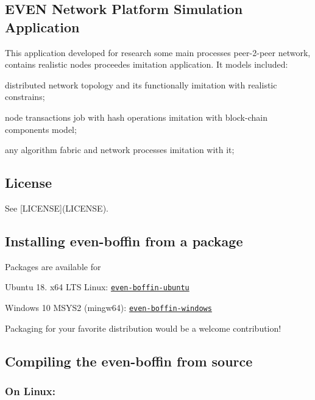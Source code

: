 \subsection*{E\+V\+EN Network Platform Simulation Application}

This application developed for research some main processes peer-\/2-\/peer network, contains realistic nodes proceedes imitation application. It models included\+:
\begin{DoxyItemize}
\item distributed network topology and its functionally imitation with realistic constrains;
\item node transactions job with hash operations imitation with block-\/chain components model;
\item any algorithm fabric and network processes imitation with it;
\end{DoxyItemize}

\subsection*{License}

See \mbox{[}L\+I\+C\+E\+N\+SE\mbox{]}(L\+I\+C\+E\+N\+SE).

\subsection*{Installing even-\/boffin from a package}

Packages are available for


\begin{DoxyItemize}
\item Ubuntu 18. x64 L\+TS Linux\+: \href{https://evenfound.org/packages/event-network-ubuntu/}{\tt even-\/boffin-\/ubuntu}
\item Windows 10 M\+S\+Y\+S2 (mingw64)\+: \href{https://evenfound.org/packages/event-network-windows/}{\tt even-\/boffin-\/windows}
\end{DoxyItemize}

Packaging for your favorite distribution would be a welcome contribution!

\subsection*{Compiling the even-\/boffin from source}

\subsubsection*{On Linux\+:}

